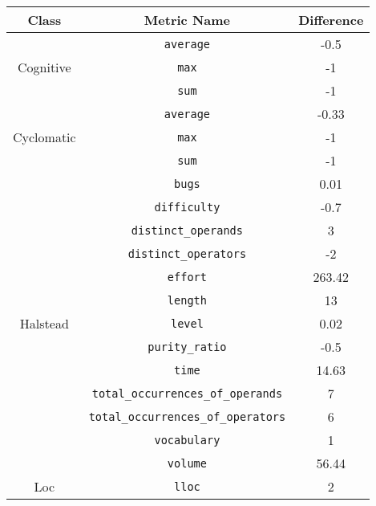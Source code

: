 \begin{center}
  \begin{tabular}{ |c|c|c| }
    \hline

    Class & Metric Name                           & Difference \\

    \hline

    \multirow{ 3 }{6em}{ Cognitive }
          & \verb|average|                        & -0.5       \\
          & \verb|max|                            & -1         \\
          & \verb|sum|                            & -1         \\
    \hline
    \multirow{ 3 }{6em}{ Cyclomatic }
          & \verb|average|                        & -0.33      \\
          & \verb|max|                            & -1         \\
          & \verb|sum|                            & -1         \\
    \hline
    \multirow{ 13 }{6em}{ Halstead }
          & \verb|bugs|                           & 0.01       \\
          & \verb|difficulty|                     & -0.7       \\
          & \verb|distinct_operands|              & 3          \\
          & \verb|distinct_operators|             & -2         \\
          & \verb|effort|                         & 263.42     \\
          & \verb|length|                         & 13         \\
          & \verb|level|                          & 0.02       \\
          & \verb|purity_ratio|                   & -0.5       \\
          & \verb|time|                           & 14.63      \\
          & \verb|total_occurrences_of_operands|  & 7          \\
          & \verb|total_occurrences_of_operators| & 6          \\
          & \verb|vocabulary|                     & 1          \\
          & \verb|volume|                         & 56.44      \\
    \hline
    \multirow{ 12 }{6em}{ Loc }
          & \verb|lloc|                           & 2          \\

\end{tabular}
\end{center}
